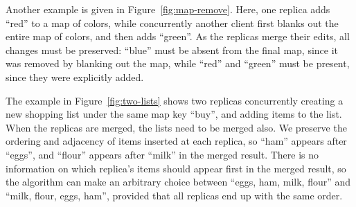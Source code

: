 \documentclass[a4paper,twocolumn,10pt]{article}
\begin{document}
Another example is given in Figure~\ref{fig:map-remove}. Here, one replica adds ``red'' to a map of colors, while concurrently another client first blanks out the entire map of colors, and then adds ``green''. As the replicas merge their edits, all changes must be preserved: ``blue'' must be absent from the final map, since it was removed by blanking out the map, while ``red'' and ``green'' must be present, since they were explicitly added.

\begin{figure*}
\centering
{}
\caption{Two replicas concurrently create ordered lists under the same map key}\label{fig:two-lists}
\end{figure*}

The example in Figure~\ref{fig:two-lists} shows two replicas concurrently creating a new shopping list under the same map key ``buy'', and adding items to the list. When the replicas are merged, the lists need to be merged also. We preserve the ordering and adjacency of items inserted at each replica, so ``ham'' appears after ``eggs'', and ``flour'' appears after ``milk'' in the merged result. There is no information on which replica's items should appear first in the merged result, so the algorithm can make an arbitrary choice between ``eggs, ham, milk, flour'' and ``milk, flour, eggs, ham'', provided that all replicas end up with the same order.
\end{document}
